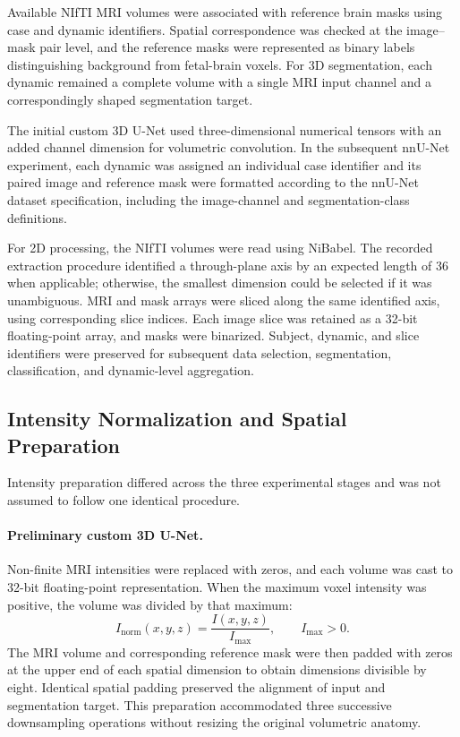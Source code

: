 Available NIfTI MRI volumes were associated with reference brain masks using case and dynamic identifiers. Spatial correspondence was checked at the image--mask pair level, and the reference masks were represented as binary labels distinguishing background from fetal-brain voxels. For 3D segmentation, each dynamic remained a complete volume with a single MRI input channel and a correspondingly shaped segmentation target.

The initial custom 3D U-Net used three-dimensional numerical tensors with an added channel dimension for volumetric convolution. In the subsequent nnU-Net experiment, each dynamic was assigned an individual case identifier and its paired image and reference mask were formatted according to the nnU-Net dataset specification, including the image-channel and segmentation-class definitions.

For 2D processing, the NIfTI volumes were read using NiBabel. The recorded extraction procedure identified a through-plane axis by an expected length of 36 when applicable; otherwise, the smallest dimension could be selected if it was unambiguous. MRI and mask arrays were sliced along the same identified axis, using corresponding slice indices. Each image slice was retained as a 32-bit floating-point array, and masks were binarized. Subject, dynamic, and slice identifiers were preserved for subsequent data selection, segmentation, classification, and dynamic-level aggregation.

\subsection{Intensity Normalization and Spatial Preparation}

Intensity preparation differed across the three experimental stages and was not assumed to follow one identical procedure.

\paragraph{Preliminary custom 3D U-Net.}
Non-finite MRI intensities were replaced with zeros, and each volume was cast to 32-bit floating-point representation. When the maximum voxel intensity was positive, the volume was divided by that maximum:
\begin{equation}
I_{\mathrm{norm}}(x,y,z)=\frac{I(x,y,z)}{I_{\max}},\qquad I_{\max}>0.
\end{equation}
The MRI volume and corresponding reference mask were then padded with zeros at the upper end of each spatial dimension to obtain dimensions divisible by eight. Identical spatial padding preserved the alignment of input and segmentation target. This preparation accommodated three successive downsampling operations without resizing the original volumetric anatomy.

